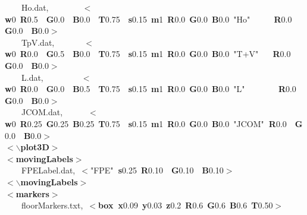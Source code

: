 \documentclass[singlecolumn,12pt]{article}
\newcommand{\hlstd}[1]{\textcolor[rgb]{0,0,0}{#1}}
\newcommand{\hlkey}[1]{\textcolor[rgb]{0,0,1}{\bf{#1}}}
\newcommand{\hlnum}[1]{\textcolor[rgb]{0.66,0,0.66}{#1}}
\newcommand{\hlstr}[1]{\textcolor[rgb]{1,0,0}{#1}}
\begin{document}
\begin{landscape}
{\hlstd{\ \ \ \ }Ho.dat,\hlstd{\ \ \ \ \ \ \ \ }}\hlkey{$<$w}\hlnum{0\ }\hlkey{R}\hlnum{0.5\hlstd{\ \ }}\hlkey{G}\hlnum{0.0\hlstd{\ \ }}\hlkey{B}\hlnum{0.0\hlstd{\ \ }}\hlkey{T}\hlnum{0.75\hlstd{\ \ }}\hlkey{s}\hlnum{0.15\ }\hlkey{m}\hlnum{1\ }\hlkey{R}\hlnum{0.0\ }\hlkey{G}\hlnum{0.0\ }\hlkey{B}\hlnum{0.0\ }\hlkey{}\hlstr{"Ho"}\hlkey{\hlstd{\ \ \ \ \ }R}\hlnum{0.0\hlstd{\ \ }}\hlkey{G}\hlnum{0.0\hlstd{\ \ }}\hlkey{B}\hlnum{0.0}\hlkey{$>$}\hlstd{\\
\hlstd{\ \ \ \ }TpV.dat,\hlstd{\ \ \ \ \ \ \ }}\hlkey{$<$w}\hlnum{0\ }\hlkey{R}\hlnum{0.0\hlstd{\ \ }}\hlkey{G}\hlnum{0.5\hlstd{\ \ }}\hlkey{B}\hlnum{0.0\hlstd{\ \ }}\hlkey{T}\hlnum{0.75\hlstd{\ \ }}\hlkey{s}\hlnum{0.15\ }\hlkey{m}\hlnum{1\ }\hlkey{R}\hlnum{0.0\ }\hlkey{G}\hlnum{0.0\ }\hlkey{B}\hlnum{0.0\ }\hlkey{}\hlstr{"T+V"}\hlkey{\hlstd{\ \ \ }R}\hlnum{0.0\hlstd{\ \ }}\hlkey{G}\hlnum{0.0\hlstd{\ \ }}\hlkey{B}\hlnum{0.0}\hlkey{$>$}\hlstd{\\
\hlstd{\ \ \ \ }L.dat,\hlstd{\ \ \ \ \ \ \ \ \ }}\hlkey{$<$w}\hlnum{0\ }\hlkey{R}\hlnum{0.0\hlstd{\ \ }}\hlkey{G}\hlnum{0.0\hlstd{\ \ }}\hlkey{B}\hlnum{0.5\hlstd{\ \ }}\hlkey{T}\hlnum{0.75\hlstd{\ \ }}\hlkey{s}\hlnum{0.15\ }\hlkey{m}\hlnum{1\ }\hlkey{R}\hlnum{0.0\ }\hlkey{G}\hlnum{0.0\ }\hlkey{B}\hlnum{0.0\ }\hlkey{}\hlstr{"L"}\hlkey{\hlstd{\ \ \ \ \ \ \ }R}\hlnum{0.0\hlstd{\ \ }}\hlkey{G}\hlnum{0.0\hlstd{\ \ }}\hlkey{B}\hlnum{0.0}\hlkey{$>$}\hlstd{\\
\hlstd{\ \ \ \ }JCOM.dat,\hlstd{\ \ \ \ \ \ }}\hlkey{$<$w}\hlnum{0\ }\hlkey{R}\hlnum{0.25\ }\hlkey{G}\hlnum{0.25\ }\hlkey{B}\hlnum{0.25\ }\hlkey{T}\hlnum{0.75\hlstd{\ \ }}\hlkey{s}\hlnum{0.15\ }\hlkey{m}\hlnum{1\ }\hlkey{R}\hlnum{0.0\ }\hlkey{G}\hlnum{0.0\ }\hlkey{B}\hlnum{0.0\ }\hlkey{}\hlstr{"J\textunderscore COM"}\hlkey{\ R}\hlnum{0.0\hlstd{\ \ }}\hlkey{G}\hlnum{0.0\hlstd{\ \ }}\hlkey{B}\hlnum{0.0}\hlkey{$>$}\hlstd{\\
}\hlkey{$<$$\backslash$plot3D$>$}\hlstd{\\
}\hlkey{$<$movingLabels$>$}\hlstd{\\
\hlstd{\ \ \ \ }FPELabel.dat,\ }\hlkey{$<$}\hlstr{"FPE"}\hlkey{\ s}\hlnum{0.25\ }\hlkey{R}\hlnum{0.10\hlstd{\ \ }}\hlkey{G}\hlnum{0.10\hlstd{\ \ }}\hlkey{B}\hlnum{0.10}\hlkey{$>$}\hlstd{\\
}\hlkey{$<$$\backslash$movingLabels$>$}\hlstd{\\
}\hlkey{$<$markers$>$}\hlstd{\\
\hlstd{\ \ \ \ }floorMarkers.txt,\ }\hlkey{$<$box\ x}\hlnum{0.09\ }\hlkey{y}\hlnum{0.03\ }\hlkey{z}\hlnum{0.2\ }\hlkey{R}\hlnum{0.6\ }\hlkey{G}\hlnum{0.6\ }\hlkey{B}\hlnum{0.6\ }\hlkey{T}\hlnum{0.50}\hlkey{$>$}\hlstd{\\
}
\end{landscape}
\end{document}
